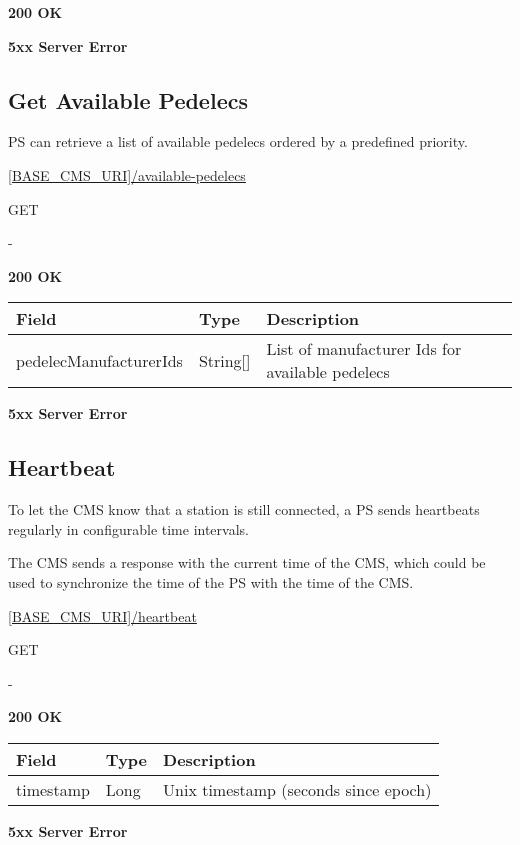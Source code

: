  \textbf{200 OK}

 \textbf{5xx Server Error}

\subsection{Get Available Pedelecs}

\acs{PS} can retrieve a list of available pedelecs ordered by a predefined priority.

 \url{[BASE_CMS_URI]/available-pedelecs}

 GET

 -

 \textbf{200 OK}

\begin{tabularx}{\linewidth}{ | l | l | X | }
  \hline
  \rowcolor{table-head}
  Field & Type & Description \\
  \hline
  	pedelecManufacturerIds			& String[] & List of manufacturer Ids for available pedelecs \\	
  \hline
\end{tabularx}

 \textbf{5xx Server Error}

\subsection{Heartbeat}

To let the \acs{CMS} know that a station is still connected, a \acs{PS} sends heartbeats regularly in configurable time intervals.

The \acs{CMS} sends a response with the current time of the \acs{CMS}, which could be used to synchronize the time of the \acs{PS} with the time of the \acs{CMS}.

 \url{[BASE_CMS_URI]/heartbeat}

 GET

 -

 \textbf{200 OK}

\begin{tabularx}{\linewidth}{ | l | l | X | }
  \hline
  \rowcolor{table-head}
  Field & Type & Description \\
  \hline
  	timestamp & Long			& Unix timestamp (seconds since epoch) \\	
  \hline
\end{tabularx}


 \textbf{5xx Server Error}